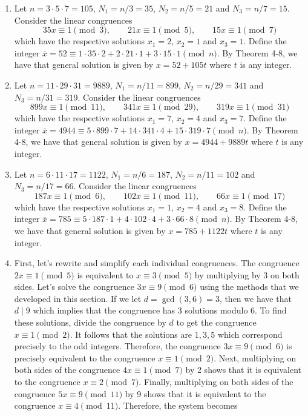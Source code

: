 \begin{solution}
    \begin{enumerate}
        \item Let $n = 3 \cdot 5 \cdot 7 = 105$, $N_1 = n / 3 = 35$, $N_2 = n / 5 = 21$ and $N_3 = n / 7 = 15$. Consider the linear congruences 
        $$35x \equiv 1 \pmod{3}, \qquad 21x \equiv 1 \pmod{5}, \qquad 15x \equiv 1 \pmod{7}$$
        which have the respective solutions $x_1 = 2$, $x_2 = 1$ and $x_3 = 1$. Define the integer $\overline{x} = 52 \equiv 1\cdot 35 \cdot 2 + 2 \cdot 21 \cdot 1 + 3 \cdot 15 \cdot 1 \pmod{n}$. By Theorem 4-8, we have that general solution is given by $x = 52 + 105t$ where $t$ is any integer.
        \item Let $n = 11 \cdot 29 \cdot 31 = 9889$, $N_1 = n / 11 = 899$, $N_2 = n / 29 = 341$ and $N_3 = n / 31 = 319$. Consider the linear congruences 
        $$899x \equiv 1 \pmod{11}, \qquad 341x \equiv 1 \pmod{29}, \qquad 319x \equiv 1 \pmod{31}$$
        which have the respective solutions $x_1 = 7$, $x_2 = 4$ and $x_3 = 7$. Define the integer $\overline{x} = 4944 \equiv 5\cdot 899 \cdot 7 + 14 \cdot 341 \cdot 4 + 15 \cdot 319 \cdot 7 \pmod{n}$. By Theorem 4-8, we have that general solution is given by $x = 4944 + 9889t$ where $t$ is any integer.
        \item Let $n = 6 \cdot 11 \cdot 17 = 1122$, $N_1 = n / 6 = 187$, $N_2 = n / 11 = 102$ and $N_3 = n / 17 = 66$. Consider the linear congruences 
        $$187x \equiv 1 \pmod{6}, \qquad 102x \equiv 1 \pmod{11}, \qquad 66x \equiv 1 \pmod{17}$$
        which have the respective solutions $x_1 = 1$, $x_2 = 4$ and $x_3 = 8$. Define the integer $\overline{x} = 785 \equiv 5\cdot 187 \cdot 1 + 4 \cdot 102 \cdot 4 + 3 \cdot 66 \cdot 8 \pmod{n}$. By Theorem 4-8, we have that general solution is given by $x = 785 + 1122t$ where $t$ is any integer.
        \item First, let's rewrite and simplify each individual congruences. The congruence $2x \equiv 1 \pmod 5$ is equivalent to $x \equiv 3 \pmod 5$ by multiplying by 3 on both sides. Let's solve the congruence $3x \equiv 9 \pmod{6}$ using the methods that we developed in this section. If we let $d = \gcd(3, 6) = 3$, then we have that $d \mid 9$ which implies that the congruence has 3 solutions modulo 6. To find these solutions, divide the congruence by $d$ to get the congruence $x \equiv 1 \pmod 2$. It follows that the solutions are $1, 3, 5$ which correspond precisely to the odd integers. Therefore, the congruence $3x \equiv 9 \pmod 6$ is precisely equivalent to the congruence $x \equiv 1 \pmod{2}$. Next, multiplying on both sides of the congruence $4x \equiv 1 \pmod 7$ by 2 shows that it is equivalent to the congruence $x \equiv 2 \pmod 7$. Finally, multiplying on both sides of the congruence $5x \equiv 9 \pmod{11}$ by 9 shows that it is equivalent to the congruence $x \equiv 4 \pmod{11}$. Therefore, the system becomes 

\end{enumerate}
\end{solution}
